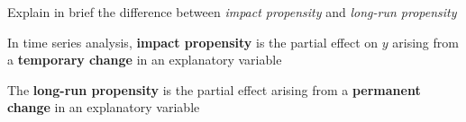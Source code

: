 
\question Explain in brief the difference between \textit{impact propensity} and \textit{long-run propensity}

\begin{solution}
  In time series analysis, \textbf{impact propensity} is the partial effect on $y$ arising 
  from a \textbf{temporary change} in an explanatory variable
  
  The \textbf{long-run propensity} is the partial effect arising from a \textbf{permanent change} in an explanatory variable
\end{solution}

